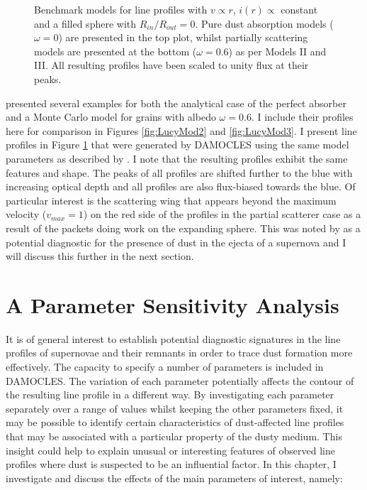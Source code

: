 \begin{figure}
\begin{subfigure}{\textwidth}
\end{subfigure}  
\caption{Benchmark models for line profiles  with $v \propto r$, $i(r) \propto$ constant and a filled sphere with $R_{in}/R_{out}=0$.  Pure dust absorption models ($\omega = 0$) are presented in the top plot, whilst partially scattering models are presented at the bottom ($\omega = 0.6$) as per \citet{Lucy1989} Models II and III. All resulting profiles have been scaled to unity flux at their peaks.}
\label{fig:Lucy}
\end{figure}


\citet{Lucy1989} presented several examples for both the analytical case of 
the perfect absorber and a Monte Carlo model for grains with albedo $\omega 
=0.6$.  I include their profiles here for comparison in Figures \ref{fig:LucyMod2} and \ref{fig:LucyMod3}.  I  present line profiles in Figure \ref{fig:Lucy} that were generated by DAMOCLES using the same model parameters as described by \citet{Lucy1989}.  I note that 
the resulting profiles exhibit the same features and shape. The peaks of all profiles are shifted further to the blue with increasing optical depth and all profiles are also flux-biased towards the blue.  Of particular 
interest is the scattering wing that appears beyond the maximum velocity 
($v_{max}=1$) on the red side of the profiles in the partial 
scatterer case as a result of the packets doing work on the expanding sphere.  
This was noted by \citet{Lucy1989} as a potential diagnostic for the 
presence of dust in the ejecta of a supernova and I  will discuss this 
further in the next section.




\section{A Parameter Sensitivity Analysis}
\label{param_sens_analysis}
It is of general interest to establish potential diagnostic signatures in 
the line profiles of supernovae and their remnants in order to trace dust 
formation more effectively. The capacity to specify a number of parameters is included in DAMOCLES.  The variation of each parameter potentially affects the contour of the resulting line profile in a different way.  By investigating each parameter separately over a range of values whilst keeping the other parameters fixed, it may be possible to identify certain characteristics of dust-affected line profiles that may be associated with a particular property of the dusty medium.  This insight could help to explain unusual or interesting features of observed line profiles where dust is suspected to be an influential factor.  In this chapter, I investigate and discuss the effects of the main 
parameters of interest, namely:

